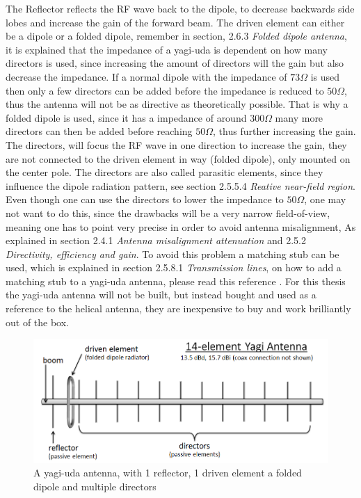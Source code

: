 The Reflector reflects the RF wave back to the dipole, to decrease backwards side lobes and increase the gain of the forward beam. The driven element can either be a dipole or a folded dipole, remember in section, 2.6.3 \textit{Folded dipole antenna}, it is explained that the impedance of a yagi-uda is dependent on how many directors is used, since increasing the amount of directors will the gain but also decrease the impedance. If a normal dipole with the impedance of $73\Omega$ is used then only a few directors can be added before the impedance is reduced to $50\Omega$, thus the antenna will not be as directive as theoretically possible. That is why a folded dipole is used, since it has a impedance of around $300\Omega$ many more directors can then be added before reaching $50\Omega$, thus further increasing the gain. The directors, will focus the RF wave in one direction to increase the gain, they are not connected to the driven element in way (folded dipole), only mounted on the center pole. The directors are also called parasitic elements, since they influence the dipole radiation pattern, see section 2.5.5.4 \textit{Reative near-field region}. Even though one can use the directors to lower the impedance to $50\Omega$, one may not want to do this, since the drawbacks will be a very narrow field-of-view, meaning one has to point very precise in order to avoid antenna misalignment, As explained in section 2.4.1 \textit{Antenna misalignment attenuation} and 2.5.2 \textit{Directivity, efficiency and gain}. To avoid this problem a matching stub can be used, which is explained in section 2.5.8.1 \textit{Transmission lines}, on how to add a matching stub to a yagi-uda antenna, please read this reference \cite{YagiMatching}. For this thesis the yagi-uda antenna will not be built, but instead bought and used as a reference to the helical antenna, they are inexpensive to buy and work brilliantly out of the box.  

\begin{figure}[h]
\centering
\includegraphics[scale=0.5]{figures/yagi-uda.png}
\caption{A yagi-uda antenna, with 1 reflector, 1 driven element a folded dipole and multiple directors\cite{YagiUda}}
\end{figure}

